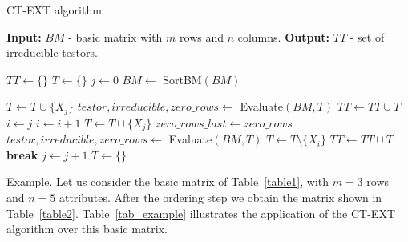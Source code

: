 \documentclass[authoryear,preprint,review,12pt]{elsarticle}
\begin{document}
\begin{algorithm}
	\begin{spacing}{1.0}
	\caption{CT-EXT algorithm}\label{ctext_algo}
	\begin{algorithmic}[1]	
		\State \textbf{Input: } $BM$ - basic matrix with $m$ rows and $n$ columns.
		\State \textbf{Output: } $TT$ - set of irreducible testors.
			
			\State $TT \gets \{\}$
			\State $T \gets \{\}$ 
			\State $j \gets 0$ 
			\State $BM \gets$ SortBM$(BM)$
			
			\label{row1condition}
				\State $T \gets T \cup \{X_j\}$
				\State $testor, irreducible, zero\_rows \gets$ Evaluate$(BM,T)$
					 
						\State $TT \gets TT \cup T$
					\EndIf
				\Else
					\State $i \gets j$
						\State $i \gets i+1$
						\State $T \gets T \cup \{X_j\}$
						\State $zero\_rows\_last \gets zero\_rows$
						\State $testor, irreducible, zero\_rows \gets$ Evaluate$(BM,T)$
							\State $T \gets T \setminus \{X_i\}$ 
						\Else
									\State $TT \gets TT \cup T$
								\EndIf
								\State \textbf{break}
							\EndIf
						\EndIf
					\EndWhile
				\EndIf
				\State $j \gets j+1$
				\State $T \gets \{\}$
			\EndWhile
	\end{algorithmic}
	\end{spacing}
\end{algorithm}

Example. Let us consider the basic matrix of Table~\ref{table1}, with $m=3$ rows and $n=5$ attributes. After the  ordering step we obtain the matrix shown in Table~\ref{table2}. Table~\ref{tab_example} illustrates the 
application of the CT-EXT algorithm over this basic matrix.
\end{document}
